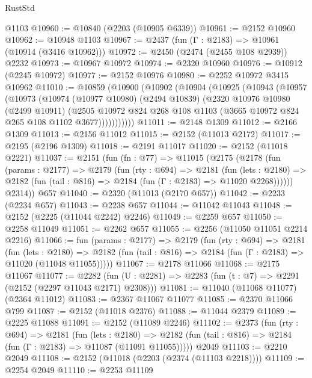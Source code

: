 \begin{lexlean}{RustStd}
\begin{coremodule}
    @1103
@10960 := @10840 (@2203 (@10905 @6339))
@10961 := @2152 @10960
@10962 := @10948 @1103
@10967 := @2437 (fun (Γ : @2183) => @10961 (@10914 (@3416 @10962)))
@10972 := @2450 (@2474 (@2455 @108 @2939)) @2232
@10973 := @10967 @10972
@10974 := @2320 @10960
@10976 := @10912 (@2245 @10972)
@10977 := @2152 @10976
@10980 := @2252 @10972 @3415 @10962
@11010 := @10859
    (@10900
      (@10902
        (@10904
          (@10925
            (@10943
              (@10957
                (@10973
                  (@10974
                    (@10977 @10980)
                    (@2494 @10839)
                    (@2320
                      @10976
                      @10980
                      (@2499 @10911)
                      (@2505
                        @10972
                        @824
                        @268
                        @108
                        @1103
                        (@3665 @10972 @824 @265 @108 @1102 @3677)))))))))))
@11011 := @2148 @1309
@11012 := @2166 @1309
@11013 := @2156 @11012
@11015 := @2152 (@11013 @2172)
@11017 := @2195 (@2196 @1309)
@11018 := @2191 @11017
@11020 := @2152 (@11018 @2221)
@11037 := @2151
    (fun (fn : @77) =>
    @11015
      (@2175
        (@2178
          (fun (params : @2177) =>
          @2179
            (fun (rty : @694) =>
            @2181
              (fun (lets : @2180) =>
              @2182 (fun (tail : @816) => @2184 (fun (Γ : @2183) => @11020 @2268))))))
        @2314))
    @657
@11040 := @2320 (@11013 (@2170 @657))
@11042 := @2233 (@2234 @657)
@11043 := @2238 @657
@11044 := @11042 @11043
@11048 := @2152 (@2225 (@11044 @2242) @2246)
@11049 := @2259 @657
@11050 := @2258 @11049
@11051 := @2262 @657
@11055 := @2256 (@11050 @11051 @2214 @2216)
@11066 := fun (params : @2177) =>
  @2179
    (fun (rty : @694) =>
    @2181
      (fun (lets : @2180) =>
      @2182 (fun (tail : @816) => @2184 (fun (Γ : @2183) => @11020 (@11048 @11055)))))
@11067 := @2178 @11066
@11068 := @2175 @11067
@11077 := @2282
    (fun (U : @2281) => @2283 (fun (t : @7) => @2291 (@2152 (@2297 @11043 @2171) @2308)))
@11081 := @11040 (@11068 @11077) (@2364 @11012)
@11083 := @2367 @11067 @11077
@11085 := @2370 @11066 @799
@11087 := @2152 (@11018 @2376)
@11088 := @11044 @2379
@11089 := @2225 @11088
@11091 := @2152 (@11089 @2246)
@11102 := @2373
    (fun (rty : @694) =>
    @2181
      (fun (lets : @2180) =>
      @2182 (fun (tail : @816) => @2184 (fun (Γ : @2183) => @11087 (@11091 @11055)))))
    @2049
@11103 := @2210 @2049
@11108 := @2152 (@11018 (@2203 (@2374 (@11103 @2218))))
@11109 := @2254 @2049
@11110 := @2253 @11109

\end{coremodule}
\end{lexlean}
